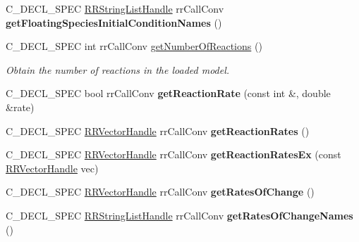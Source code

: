 \begin{DoxyCompactItemize}
\item 
\hypertarget{group__loadsave_ga4b87e338bfb9d788c31987f8154818f6}{
\-C\-\_\-\-D\-E\-C\-L\-\_\-\-S\-P\-E\-C \hyperlink{rr__c__types_8h_abf561b014879247b7b92ee99c205de21}{\-R\-R\-String\-List\-Handle} \*
rr\-Call\-Conv {\bfseries get\-Floating\-Species\-Initial\-Condition\-Names} ()}
\label{group__loadsave_ga4b87e338bfb9d788c31987f8154818f6}

\item 
\-C\-\_\-\-D\-E\-C\-L\-\_\-\-S\-P\-E\-C int rr\-Call\-Conv \hyperlink{group__loadsave_gae25399f84ff2d1fda619358a1af9a1b5}{get\-Number\-Of\-Reactions} ()
\begin{DoxyCompactList}\small\item\em \-Obtain the number of reactions in the loaded model. \end{DoxyCompactList}\item 
\hypertarget{group__loadsave_ga0a7be404315c6001627ee26e738e11e2}{
\-C\-\_\-\-D\-E\-C\-L\-\_\-\-S\-P\-E\-C bool rr\-Call\-Conv {\bfseries get\-Reaction\-Rate} (const int \&, double \&rate)}
\label{group__loadsave_ga0a7be404315c6001627ee26e738e11e2}

\item 
\hypertarget{group__loadsave_ga86d544bcf3eeaa4698a60123a3da69aa}{
\-C\-\_\-\-D\-E\-C\-L\-\_\-\-S\-P\-E\-C \hyperlink{rr__c__types_8h_aea46a16752b0ae2cd95c009030ee630e}{\-R\-R\-Vector\-Handle} \*
rr\-Call\-Conv {\bfseries get\-Reaction\-Rates} ()}
\label{group__loadsave_ga86d544bcf3eeaa4698a60123a3da69aa}

\item 
\hypertarget{group__loadsave_gaa03d9414ddeb177a76365dd5b2d0042e}{
\-C\-\_\-\-D\-E\-C\-L\-\_\-\-S\-P\-E\-C \hyperlink{rr__c__types_8h_aea46a16752b0ae2cd95c009030ee630e}{\-R\-R\-Vector\-Handle} \*
rr\-Call\-Conv {\bfseries get\-Reaction\-Rates\-Ex} (const \hyperlink{rr__c__types_8h_aea46a16752b0ae2cd95c009030ee630e}{\-R\-R\-Vector\-Handle} vec)}
\label{group__loadsave_gaa03d9414ddeb177a76365dd5b2d0042e}

\item 
\hypertarget{group__loadsave_gabbe129bee63761f7b0f98f060b86067b}{
\-C\-\_\-\-D\-E\-C\-L\-\_\-\-S\-P\-E\-C \hyperlink{rr__c__types_8h_aea46a16752b0ae2cd95c009030ee630e}{\-R\-R\-Vector\-Handle} \*
rr\-Call\-Conv {\bfseries get\-Rates\-Of\-Change} ()}
\label{group__loadsave_gabbe129bee63761f7b0f98f060b86067b}

\item 
\hypertarget{group__loadsave_gaf9d5b185617519ceff1a018d9009c0fd}{
\-C\-\_\-\-D\-E\-C\-L\-\_\-\-S\-P\-E\-C \hyperlink{rr__c__types_8h_abf561b014879247b7b92ee99c205de21}{\-R\-R\-String\-List\-Handle} \*
rr\-Call\-Conv {\bfseries get\-Rates\-Of\-Change\-Names} ()}
\label{group__loadsave_gaf9d5b185617519ceff1a018d9009c0fd}


\end{DoxyCompactItemize}
